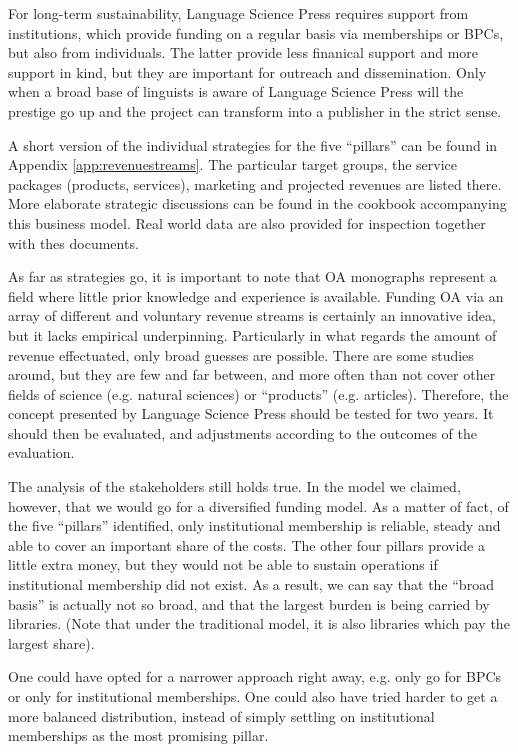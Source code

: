 \documentclass[nonflat,smallfont
]{langsci/langscibook}
\newcommand{\evaluation}[1]{
  \renewcommand{\tblslinecolour}{lsLightOrange}
  \tblssy{receipt}{Evaluation}{\vspace*{-5mm}#1}
}
\newcommand{\othersolutions}[1]{
  \renewcommand{\tblslinecolour}{lsDarkGreenOne}
  \tblssy{more}{Other solutions}{\vspace*{-5mm}#1}
}
\renewcommand{\tblssy}[4][black!12]{%
  \renewcommand{\langscisymbol}{#2}\renewcommand{\tblsboxcolor}{#1}
  \begin{mdframed}[style=yellowexercise,frametitle={#3}]
    #4
  \end{mdframed}
}
\begin{document}
{For long-term sustainability, Language Science Press requires support from institutions, which provide funding on a regular basis via memberships or BPCs, but also from individuals. The latter provide less finanical support and more support in kind, but they are important for outreach and dissemination. Only when a broad base of linguists is aware of Language Science Press will the prestige go up and the project can transform into a publisher in the strict sense. 

A short version of the individual strategies for the five ``pillars'' can be found in Appendix \ref{app:revenuestreams}. The particular target groups, the service packages (products, services), marketing and projected revenues are listed there. More elaborate strategic discussions can be found in the cookbook accompanying this business model. Real world data are also provided for inspection together with thes documents. 

As far as strategies go, it is important to note that OA monographs represent a field where little prior knowledge and experience is available. Funding OA via an array of different and voluntary revenue streams is certainly an innovative idea, but it lacks empirical underpinning. Particularly in what regards the amount of revenue effectuated, only broad guesses are possible. There are some studies around, but they are few and far between, and more often than not cover other fields of science (e.g. natural sciences) or ``products'' (e.g. articles). Therefore, the concept presented by Language Science Press should be tested for two years. It should then be evaluated, and adjustments according to the outcomes of the evaluation. 
}
\evaluation{
The analysis of the stakeholders still holds true. In the model we claimed, however, that we would go for a diversified funding model. As a matter of fact, of the five ``pillars'' identified, only institutional membership is reliable, steady and able to cover an important share of the costs. The other four pillars provide a little extra money, but they would not be able to sustain operations if institutional membership did not exist. As a result, we can say that the ``broad basis'' is actually not so broad, and that the largest burden is being carried by libraries. (Note that under the traditional model, it is also libraries which pay the largest share).
}

\othersolutions{
One could have opted for a narrower approach right away, e.g. only go for BPCs or only for institutional memberships. One could also have tried harder to get a more balanced distribution, instead of simply settling on institutional memberships as the most promising pillar. 
}
\end{document}
